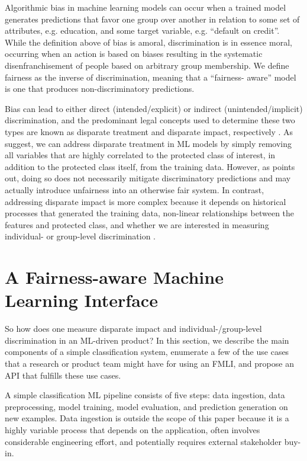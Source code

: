 \documentclass{interact}
\begin{document}
Algorithmic bias in machine learning models can occur when a trained model
generates predictions that favor one group over another in relation to some set
of attributes, e.g. education, and some target variable, e.g. ``default on
credit''. While the definition above of bias is amoral, discrimination is in
essence moral, occurring when an action is based on biases resulting in the
systematic disenfranchisement of people based on arbitrary group membership. We
define fairness as the inverse of discrimination, meaning that a ``fairness-
aware'' model is one that produces non-discriminatory predictions.

Bias can lead to either direct (intended/explicit) or indirect
(unintended/implicit) discrimination, and the predominant legal concepts used to
determine these two types are known as disparate treatment and disparate impact,
respectively \cite{barocas2016big}. As \cite{kusner2017counterfactual,
kamiran2012data} suggest, we can address disparate treatment in ML models by
simply removing all variables that are highly correlated to the protected class
of interest, in addition to the protected class itself, from the training data.
However, as \cite{kusner2017counterfactual} points out, doing so does not
necessarily mitigate discriminatory predictions and may actually introduce
unfairness into an otherwise fair system. In contrast, addressing disparate
impact is more complex because it depends on historical processes that generated
the training data, non-linear relationships between the features and protected
class, and whether we are interested in measuring individual- or group-level
discrimination \cite{dwork2012fairness}.

\section{A Fairness-aware Machine Learning Interface}

So how does one measure
disparate impact and individual-/group-level discrimination in an ML-driven
product? In this section, we describe the main components of a simple
classification system, enumerate a few of the use cases that a research or
product team might have for using an FMLI, and propose an API that fulfills
these use cases.

A simple classification ML pipeline consists of five steps: data ingestion, data
preprocessing, model training, model evaluation, and prediction generation on
new examples. Data ingestion is outside the scope of this paper because it is a
highly variable process that depends on the application, often involves
considerable engineering effort, and potentially requires external stakeholder
buy-in.
\end{document}
